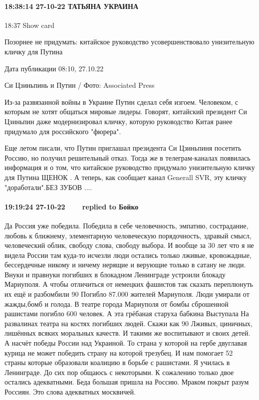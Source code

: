 \paragraph{18:38:14 27-10-22 ТАТЬЯНА УКРАИНА}
18:37
Show card

Позорнее не придумать: китайское руководство усовершенствовало унизительную
кличку для Путина

Дата публикации
08:10, 27.10.22

Си Цзиньпинь и Путин / Фото: Associated Press

Из-за развязанной войны в Украине Путин сделал себя изгоем. Человеком, с
которым не хотят общаться мировые лидеры. Говорят, китайский президент Си
Цзиньпин даже модернизировал кличку, которую руководство Китая ранее придумало
для российского "фюрера".

Еще летом писали, что Путин приглашал президента Си Цзиньпиня посетить Россию,
но получил решительный отказ. Тогда же в телеграм-каналах появилась информация
и о том, что китайское руководство придумало унизительную кличку для Путина
ЩЕНОК . А теперь, как сообщает канал Generall SVR, эту кличку "доработали".БЕЗ
ЗУБОВ ....

\paragraph{19:19:24 27-10-22 💞💞💞💞 💞💞replied to Бойко}

Да Россия уже победила.
Победила в себе человечность, эмпатию, сострадание, любовь к ближнему, элементарную человеческую порядочность, здравый смысл, человеческий облик, свободу слова, свободу выбора. И вообще за 30 лет что я не видела России там куда-то исчезли люди остались только лживые, кровожадные, бессердечные никому и ничему нерящие и верующие только в сатану не люди.
Внуки и правнуки погибших в блокадном Ленинграде устроили блокаду Мариуполя.
А чтобы отличиться от немецких фашистов так сказать переплюнуть их ещё и разбомбили 90%
Погибло 87.000 жителей Мариуполя.
Люди умирали от жажды,бомб и голода.
В театре города Мариуполя от бомбы сброшенной рашистами погибло 600 человек.
А эта грёбаная старуха бабкина
Выступала На развалинах театра на костях погибших людей.
Скажи как 90%
Лживых, циничных, лишённых всяких моральных качеств.
И такими же воспитывают и своих детей.
А насчёт победы России над Украиной.
То страна у которой на гербе двуглавая курица не может победить страну на которой трезубец.
И нам помогает 52 страны которые образовали коалицию в борьбе с рашистами.
Я училась в Ленинграде.
До сих пор общаюсь с некоторыми.
К сожалению только двое остались адекватными.
Беда большая пришла на Россию.
Мраком покрыт разум Россиян.
Это слова адекватных москвичей.

